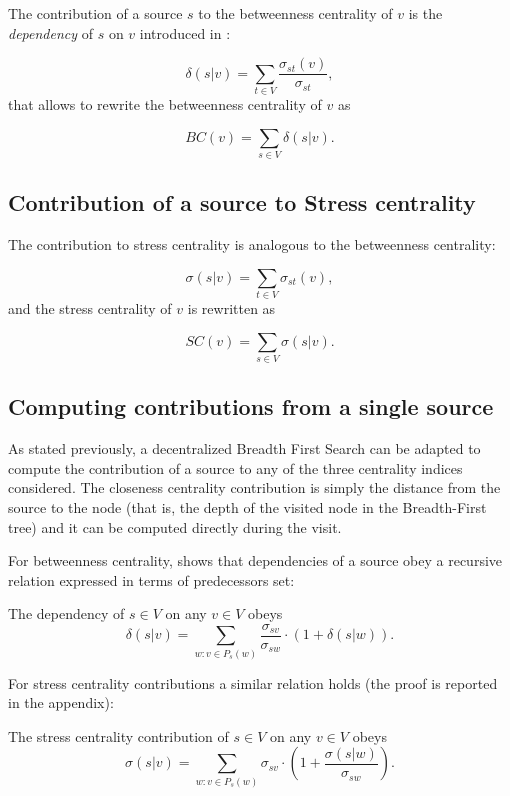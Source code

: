 The contribution of a source $s$ to the betweenness centrality of $v$ is the \emph{dependency} of $s$ on $v$ introduced in \cite{brandes2001}:

\begin{equation}
\delta(s|v) = \sum_{t \in V} \frac{\sigma_{st}(v)}{\sigma_{st}},
\end{equation}
that allows to rewrite the betweenness centrality of $v$ as

\begin{equation*}
BC(v) = \sum_{s \in V} \delta(s|v).
\end{equation*}

\subsection*{Contribution of a source to Stress centrality}

The contribution to stress centrality is analogous to the betweenness centrality:

\begin{equation}
\sigma(s|v) = \sum_{t \in V} \sigma_{st}(v),
\end{equation}
and the stress centrality of $v$ is rewritten as

\begin{equation*}
SC(v) = \sum_{s \in V} \sigma(s|v).
\end{equation*}

\subsection{Computing contributions from a single source}
\label{sec:recursive}

As stated previously, a decentralized Breadth First Search can be adapted to compute the contribution of a source to any of the three centrality indices considered. The closeness centrality contribution is simply the distance from the source to the node (that is, the depth of the visited node in the Breadth-First tree) and it can be computed directly during the visit.

For betweenness centrality, \cite{brandes2001} shows that dependencies of a source obey a recursive relation expressed in terms of predecessors set:
\begin{theorem}[Brandes, 2001]
The dependency of $s \in V$ on any $v \in V$ obeys
\begin{equation}
\delta(s|v) = \sum_{w : v \in P_s(w)} \frac{\sigma_{sv}}{\sigma_{sw}} \cdot (1 + \delta(s|w)) .
\end{equation}
\end{theorem}
For stress centrality contributions a similar relation holds (the proof is reported in the appendix):
\begin{theorem}
The stress centrality contribution of $s \in V$ on any $v \in V$ obeys
\begin{equation}
\sigma(s|v) = \sum_{w : v \in P_s(w)} \sigma_{sv} \cdot \left( 1 + \frac{\sigma(s|w)}{\sigma_{sw}} \right) .
\end{equation}
\end{theorem}

